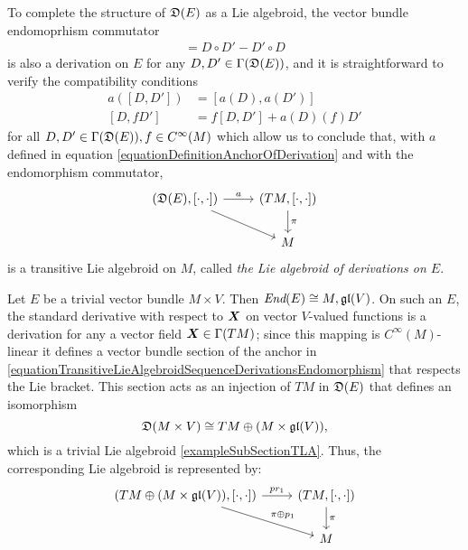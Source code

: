 To complete the structure of $\mathfrak{D}(E)$ as a Lie algebroid, the vector bundle endomoprhism commutator
\begin{align*}
    [D, D'] = D \circ D' - D' \circ D
\end{align*}
is also a derivation on $E$ for any $D, D' \in \Gamma(\mathfrak{D}(E))$, and it is straightforward to verify the compatibility conditions
\begin{align}
    a([D, D']) &= [a(D), a(D')] \\
    [D, f D'] &= f[D, D'] + a(D)(f) D'
\end{align}
for all $D, D' \in \Gamma(\mathfrak{D}(E)), f \in C^\infty(M)$ which allow us to conclude that, with $a$ defined in equation \eqref{equationDefinitionAnchorOfDerivation} and with the endomorphism commutator,
\begin{equation}
    \begin{tikzcd}
    (\alg D(E), [\cdot, \cdot]) \arrow{r}{a} \arrow{dr}{} & (TM, [\cdot, \cdot]) \arrow{d}{\pi}\\
    & M
    \end{tikzcd}
\end{equation}
is a transitive Lie algebroid on $M$, called \emph{the Lie algebroid of derivations on $E$}.

\begin{example}
\label{exampleDerivationsLieAlgebroidOfATrivialVectorBundleglV}
Let $E$ be a trivial vector bundle $M \times V$. Then $\operatorname{\textit{End}}(E) \cong M, \mathfrak{gl}(V)$. On such an $E$, the standard derivative with respect to $\bm{X}$ on vector $V$-valued functions is a derivation for any a vector field $\bm{X} \in \Gamma(TM)$; since this mapping is $C^\infty(M)$-linear it defines a vector bundle section of the anchor in \eqref{equationTransitiveLieAlgebroidSequenceDerivationsEndomorphism} that respects the Lie bracket. This section acts as an injection of $TM$ in $\mathfrak{D}(E)$ that defines an isomorphism
\begin{equation}
    \mathfrak{D}(M \times V) \cong  TM \oplus (M \times \mathfrak{gl}(V)),
\end{equation}
which is a trivial Lie algebroid \ref{exampleSubSectionTLA}.
Thus, the corresponding Lie algebroid is represented by:
\begin{equation}
    \begin{tikzcd}
    (TM \oplus (M \times \alg{gl}(V)), [\cdot, \cdot]) \arrow{r}{pr_1} \arrow{dr}{\pi\oplus p_1} & (TM, [\cdot, \cdot]) \arrow{d}{\pi}\\
    & M
    \end{tikzcd}
\end{equation}
\end{example}

